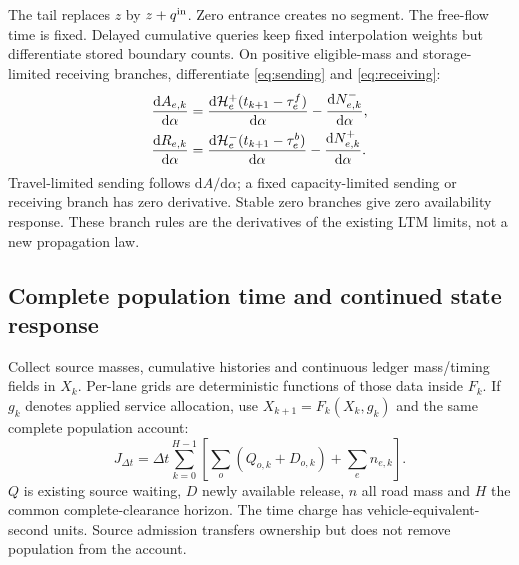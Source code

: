 \documentclass[10pt,a4paper]{article}
\newcommand{\rev}[1]{{\color{revisionred}#1}}
\begin{document}
The tail replaces $z$ by $z+q^{\rm in}$. Zero entrance creates no segment.
The free-flow time is fixed. Delayed cumulative queries keep fixed
interpolation weights but differentiate stored boundary counts. On
positive eligible-mass and storage-limited receiving branches,
differentiate \rev{\eqref{eq:sending}} and \rev{\eqref{eq:receiving}}:
\begin{equation}
 \begin{aligned}
 \frac{\mathrm dA_{e,k}}{\mathrm d\alpha}
 &=\frac{\mathrm d{\cal H}^+_e(t_{k+1}-\tau^f_e)}{\mathrm d\alpha}
                     -\frac{\mathrm dN^-_{e,k}}{\mathrm d\alpha},\\
 \frac{\mathrm dR_{e,k}}{\mathrm d\alpha}
 &=\frac{\mathrm d{\cal H}^-_e(t_{k+1}-\tau^b_e)}{\mathrm d\alpha}
                     -\frac{\mathrm dN^+_{e,k}}{\mathrm d\alpha}.
 \end{aligned}
 \label{eq:ltm-derivative}
\end{equation}
Travel-limited sending follows $\mathrm dA/\mathrm d\alpha$; a fixed
capacity-limited sending or receiving branch has zero derivative.
Stable zero branches give zero availability response. These branch rules
are the derivatives of the existing LTM limits, not a new propagation law.
\par

\begin{samepage}
\section{Complete population time and continued state response}


Collect source masses, cumulative histories and continuous ledger
mass/timing fields in $X_k$. Per-lane grids are deterministic functions
of those data inside $F_k$. If $g_k$ denotes applied service allocation,
use $X_{k+1}=F_k(X_k,g_k)$ and the same complete population account:
\begin{equation}
 J_{\Delta t}=\Delta t\sum_{k=0}^{H-1}
 \left[\sum_o(Q_{o,k}+D_{o,k})+\sum_en_{e,k}\right].
 \label{eq:tst}
\end{equation}
$Q$ is existing source waiting, $D$ newly available release, $n$ all road
mass and $H$ the common complete-clearance horizon. The time charge has
vehicle-equivalent-second units. Source admission transfers ownership but
does not remove population from the account.
\par\end{samepage}
\end{document}
